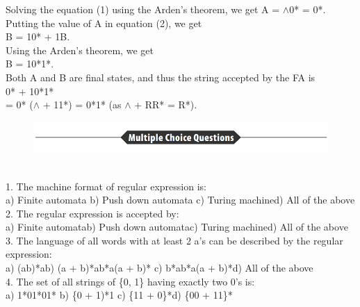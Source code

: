 \documentclass[10pt,a4paper]{book}
\begin{document}
Solving the equation (1) using the Arden’s theorem, we get A = $\land$0* = 0*.\\
 Putting the value of A in equation (2), we get\\
\hspace*{5cm} B = 10* + 1B.\\
 Using the Arden’s theorem, we get\\
\hspace*{5cm} B = 10*1*.\\
 Both A and B are final states, and thus the string accepted by the FA is\\
\hspace*{5cm} 0* + 10*1*\\
\hspace*{5cm}= 0* ($\land$ + 11*) = 0*1* (as $\land$ + RR* = R*).
\begin{figure}[!ht]
\centering
\includegraphics[scale=0.6]{288.png}
\end{figure}\\
\small
1. The machine format of regular expression is:\\ \hspace*{0.1cm}a) Finite automata \hspace*{0.1cm}b) Push down automata \hspace*{0.2cm}c) Turing machine\hspace*{0.5cm}d) All of the above\\
 2. The regular expression is accepted by:\\ a) Finite automata\hspace*{0.5cm}b) Push down automata\hspace*{0.5cm}c) Turing machine\hspace*{0.5cm}d) All of the above\\
3. The language of all words with at least 2 a’s can be described by the regular expression:\\ a) (ab)*a\hspace*{0.5cm}b) (a + b)*ab*a(a + b)*\hspace*{0.5cm} c) b*ab*a(a + b)*\hspace*{0.5cm}d) All of the above\\
 4. The set of all strings of \{0, 1\} having exactly two 0’s is:\\ 
 a) 1*01*01*\hspace*{0.5cm} b) \{0 + 1)*1\hspace*{0.5cm} c) \{11 + 0\}*\hspace*{0.5cm}d) \{00 + 11\}*
 
\end{document}
